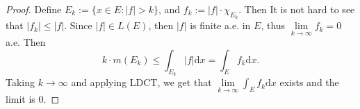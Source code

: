 \begin{proof}
  Define $E_k := \{x \in E: |f| > k\}$, and $f_k := |f| \cdot \chi_{E_k}$.
  Then It is not hard to see that $|f_k| \leq |f|$.
  Since $|f| \in L(E)$, then $|f|$ is finite a.e. in $E$,
  thus $\lim \limits _{k \rightarrow \infty} f_k = 0$ a.e.
  Then
  \begin{equation}
    k \cdot m(E_k) \leq \int_{E_k} |f| \mathrm{d} x = \int_E f_k \mathrm{d} x.
  \end{equation}
  Taking $k \rightarrow \infty$ and applying LDCT,
  we get that $\lim \limits _{k \rightarrow \infty} \int_E f_k \mathrm{d} x$ exists and the limit is $0$.
\end{proof}





